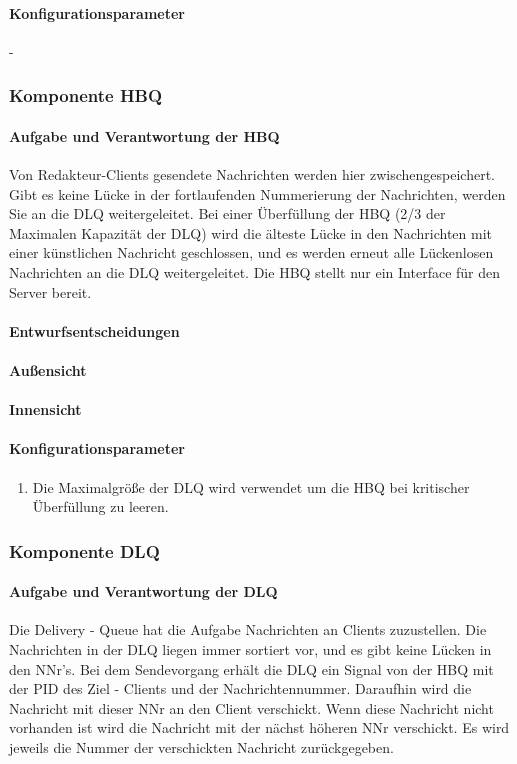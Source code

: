 \documentclass{article}
\begin{document}
			\paragraph{Konfigurationsparameter}
				-
			
			
		\subsubsection{Komponente HBQ}
			\paragraph{Aufgabe und Verantwortung der HBQ}
				Von Redakteur-Clients gesendete Nachrichten werden hier zwischengespeichert. Gibt es keine Lücke in der fortlaufenden Nummerierung der Nachrichten, werden Sie an die DLQ weitergeleitet. Bei einer Überfüllung der HBQ (2/3 der Maximalen Kapazität der DLQ) wird die älteste Lücke in den Nachrichten mit einer künstlichen Nachricht geschlossen, und es werden erneut alle Lückenlosen Nachrichten an die DLQ weitergeleitet. Die HBQ stellt nur ein Interface für den Server bereit.
			\paragraph{Entwurfsentscheidungen}
			\paragraph{Außensicht}
			\paragraph{Innensicht}
			\paragraph{Konfigurationsparameter}
				\begin{enumerate}
    				\item{Die Maximalgröße der DLQ wird verwendet um die HBQ bei kritischer 
    				Überfüllung zu leeren.}
    			\end{enumerate}
			
		\subsubsection{Komponente DLQ}
			\paragraph{Aufgabe und Verantwortung der DLQ}
				Die Delivery - Queue hat die Aufgabe Nachrichten an Clients zuzustellen. 
				Die Nachrichten in der DLQ liegen immer sortiert vor, und es gibt keine Lücken in den NNr’s.
				Bei dem Sendevorgang erhält die DLQ ein Signal von der HBQ mit der PID des Ziel - Clients und der Nachrichtennummer. Daraufhin wird die Nachricht mit dieser NNr an den Client verschickt.
				Wenn diese Nachricht nicht vorhanden ist wird die Nachricht mit der nächst höheren NNr verschickt. 
				Es wird jeweils die Nummer der verschickten Nachricht zurückgegeben.
\end{document}
